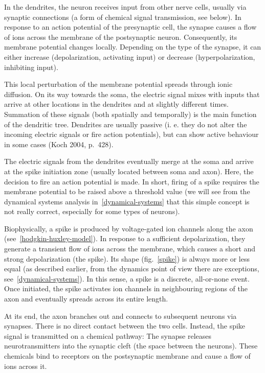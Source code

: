 \documentclass[12pt,a4paper,]{report}
\begin{document}
In the dendrites, the neuron receives input from other nerve cells,
usually via synaptic connections (a form of chemical signal
transmission, see below). In response to an action potential of the
presynaptic cell, the synapse causes a flow of ions across the membrane
of the postsynaptic neuron. Consequently, its membrane potential changes
locally. Depending on the type of the synapse, it can either increase
(depolarization, activating input) or decrease (hyperpolarization,
inhibiting input).

This local perturbation of the membrane potential spreads through ionic
diffusion. On its way towards the soma, the electric signal mixes with
inputs that arrive at other locations in the dendrites and at slightly
different times. Summation of these signals (both spatially and
temporally) is the main function of the dendritic tree. Dendrites are
usually passive (i. e. they do not alter the incoming electric signals
or fire action potentials), but can show active behaviour in some cases
(Koch 2004, p.~428).

The electric signals from the dendrites eventually merge at the soma and
arrive at the spike initiation zone (usually located between soma and
axon). Here, the decision to fire an action potential is made. In short,
firing of a spike requires the membrane potential to be raised above a
threshold value (we will see from the dynamical systems analysis
in~\ref{dynamical-systems} that this simple concept is not really
correct, especially for some types of neurons).

Biophysically, a spike is produced by voltage-gated ion channels along
the axon (see~\ref{hodgkin-huxley-model}). In response to a sufficient
depolarization, they generate a transient flow of ions across the
membrane, which causes a short and strong depolarization (the spike).
Its shape (fig.~\ref{spike}) is always more or less equal (as described
earlier, from the dynamics point of view there are exceptions,
see~\ref{dynamical-systems}). In this sense, a spike is a discrete,
all-or-none event. Once initiated, the spike activates ion channels in
neighbouring regions of the axon and eventually spreads across its
entire length.

At its end, the axon branches out and connects to subsequent neurons via
synapses. There is no direct contact between the two cells. Instead, the
spike signal is transmitted on a chemical pathway: The synapse releases
neurotransmitters into the synaptic cleft (the space between the
neurons). These chemicals bind to receptors on the postsynaptic membrane
and cause a flow of ions across it.
\end{document}
